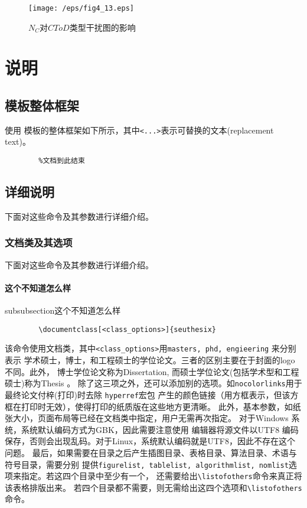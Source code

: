 \documentclass[figurelist,tablelist,algorithmlist,nomlist,masters]{seuthesix}
\begin{document}
	\begin{figure}[!h]
		\centering
		\texttt{[image: /eps/fig4\_13.eps]}
		\caption{$N_C$对$CToD$类型干扰图的影响}
		\label{fig4_13}
	\end{figure}
	
	
	
	
	
	
	\chapter{说明}
	\section{模板整体框架}
	使用 \seuthesix 模板的整体框架如下所示，其中\verb+<...>+表示可替换的文本(replacement text)。
	{\color{magenta}
		\begin{verbatim}
		%文档到此结束
		\end{verbatim}
	}
	
	\section{详细说明}
	下面对这些命令及其参数进行详细介绍。
	\subsection{文档类及其选项}
	下面对这些命令及其参数进行详细介绍。
	\subsubsection{这个不知道怎么样}
	subsubsection{这个不知道怎么样}
	
	{\color{magenta}
		\begin{verbatim}
		\documentclass[<class_options>]{seuthesix}
		\end{verbatim}
	}
	该命令使用\seuthesix 文档类，其中\verb+<class_options>+用\texttt{masters, phd, engieering} 来分别表示
	学术硕士，博士，和工程硕士的学位论文。三者的区别主要在于封面的logo 不同。此外，
	博士学位论文称为Dissertation, 而硕士学位论文(包括学术型和工程硕士)称为Thesis 。
	除了这三项之外，还可以添加别的选项。如{\texttt{nocolorlinks}}用于最终论文付梓(打印)时去除
	\texttt{hyperref}宏包
	产生的颜色链接（用方框表示，但该方框在打印时无效），使得打印的纸质版在这些地方更清晰。
	此外，基本参数，如纸张大小，页面布局等已经在文档类中指定，用户无需再次指定。
	对于Windows 系统，系统默认编码方式为GBK，因此需要注意使用
	编辑器将源文件以UTF8 编码保存，否则会出现乱码。对于Linux，系统默认编码就是UTF8，因此不存在这个问题。
	最后，如果需要在目录之后产生插图目录、表格目录、算法目录、术语与符号目录，需要分别
	提供\texttt{figurelist, tablelist, algorithmlist, nomlist}选项来指定。若这四个目录中至少有一个，
	还需要给出\verb+\listofothers+命令来真正将该表格排版出来。
	若四个目录都不需要，则无需给出这四个选项和\verb+\listofothers+命令。
\end{document}
